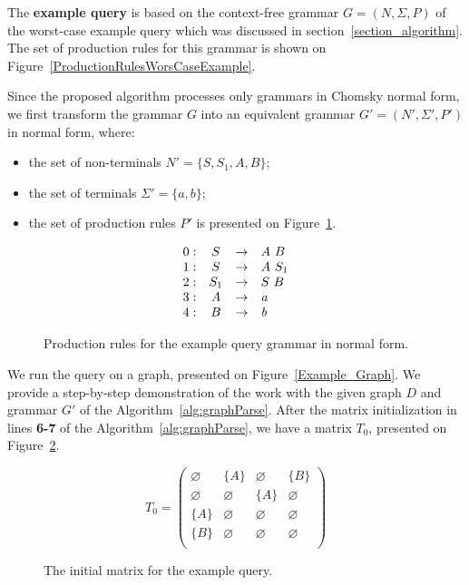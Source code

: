 The \textbf{example query} is based on the context-free grammar $G = (N, \Sigma, P)$ of the worst-case example query which was discussed in section~\ref{section_algorithm}. The set of production rules for this grammar is shown on Figure~\ref{ProductionRulesWorsCaseExample}.

Since the proposed algorithm processes only grammars in Chomsky normal form, we first transform the grammar $G$ into an equivalent grammar $G' = (N', \Sigma', P')$ in normal form, where:
\begin{itemize}
    \item the set of non-terminals $N' = \{S, S_1, A, B\}$;
    \item the set of terminals $\Sigma' = \{a, b\}$;
    \item the set of production rules $P'$ is presented on Figure~\ref{ProductionRulesExampleQueryCNF}.
\end{itemize}

\begin{figure}[h]
   \[
\begin{array}{rccl}
   0: & S & \rightarrow & A \ B \\
   1: & S & \rightarrow & A \ S_1 \\
   2: & S_1 & \rightarrow & S \ B \\
   3: & A & \rightarrow & \text{\emph{a}} \\ 
   4: & B & \rightarrow & \text{\emph{b}} \\ 
\end{array}
\]
\caption{Production rules for the example query grammar in normal form.}
\label{ProductionRulesExampleQueryCNF}
\end{figure}

We run the query on a graph, presented on Figure~\ref{Example_Graph}. We provide a step-by-step demonstration of the work with the given graph $D$ and grammar $G'$ of the Algorithm~\ref{alg:graphParse}. After the matrix initialization in lines \textbf{6-7} of the Algorithm~\ref{alg:graphParse}, we have a matrix $T_0$, presented on Figure~\ref{ExampleQueryInitMatrix}.

\begin{figure}[h]
\[
T_0 = \begin{pmatrix}
    \varnothing & \{A\}       & \varnothing & \{B\}       \\
    \varnothing & \varnothing & \{A\}       & \varnothing \\
    \{A\}       & \varnothing & \varnothing & \varnothing \\
    \{B\}       & \varnothing & \varnothing & \varnothing \\
\end{pmatrix}
\]
\caption{The initial matrix for the example query.}
\label{ExampleQueryInitMatrix}
\end{figure}

